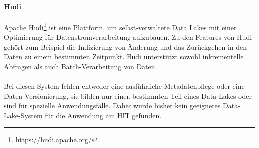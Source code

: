 \paragraph{Hudi} Apache Hudi\footnote{https://hudi.apache.org/} ist eine Plattform, um selbst-verwaltete Data Lakes mit einer Optimierung für Datenstromverarbeitung aufzubauen.
Zu den Features von Hudi gehört zum Beispiel die Indizierung von Änderung und das Zurückgehen in den Daten zu einem bestimmten Zeitpunkt.
Hudi unterstützt sowohl inkrementelle Abfragen als auch Batch-Verarbeitung von Daten.

\paragraph{}
Bei diesen System fehlen entweder eine ausführliche Metadatenpflege oder eine Daten Versionierung, sie bilden nur einen bestimmten Teil eines Data Lakes oder sind für spezielle Anwendungsfälle.
Daher wurde bisher kein geeignetes Data-Lake-System für die Anwendung am HIT gefunden.



